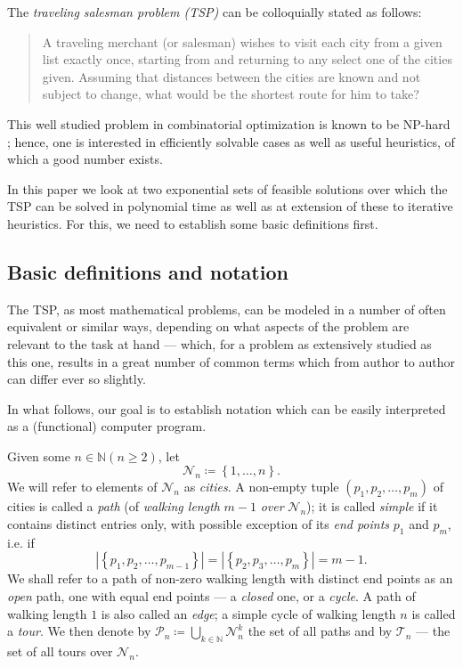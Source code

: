 \documentclass[index=totoc,bibliography=totoc]{scrartcl}
\newcommand{\annotation}[1]{\marginpar{\small\itshape\color{green}#1}}
\numberwithin{equation}{section}
\numberwithin{figure}{section}
\numberwithin{table}{section}
\let\defstyle\itshape
\begin{document}
The {\defstyle traveling salesman problem (TSP)} can be colloquially stated as follows:
\blockquote{%
  A traveling merchant (or salesman) wishes to visit each city from a given
  list exactly once, starting from and returning to any select one of the cities
  given.  Assuming that distances between the cities are known and not
  subject to change, what would be the shortest route for him to take?
}
This well studied problem in combinatorial optimization is known to be
NP-hard \cite{Karp72}; hence, one is interested in efficiently solvable
cases as well as useful heuristics, of which a good number exists.

In this paper we look at two exponential sets of feasible solutions over
which the TSP can be solved in polynomial time as well as at extension
of these to iterative heuristics.  For this, we need to establish some basic
definitions first.

\subsection{Basic definitions and notation}

The TSP, as most mathematical problems, can be modeled in a number of often
equivalent or similar ways, depending on what aspects of the problem are
relevant to the task at hand --- which, for a problem as extensively studied
as this one, results in a great number of common terms which from author to
author can differ ever so slightly.

In what follows, our goal is to establish notation which can be easily
interpreted as a (functional) computer program.

\begin{define}
Given some $n \in \mathbb{N} \left(n \geq 2\right)$,
let \[\mathcal{N}_n \coloneqq \left\{1,\ldots,n\right\}.\]
We will refer to elements of $\mathcal{N}_n$ as {\defstyle cities}.
A non-empty tuple $\left(p_1,p_2,\ldots,p_m\right)$
of cities is called a {\defstyle path} (of {\defstyle walking length} $m-1$
{\defstyle over} $\mathcal{N}_n$);
it is called {\defstyle simple} if it contains distinct entries only, with
possible exception of its {\defstyle end points} $p_1$ and $p_m$, i.e. if
\[\left|\left\{p_1,p_2,\ldots,p_{m-1}\right\}\right| =
\left|\left\{p_2,p_3,\ldots,p_{m}\right\}\right| = m-1.\]  We shall refer to
a path of non-zero walking length with distinct end points as an {\defstyle open} path,
one with equal end points --- a {\defstyle closed} one, or a {\defstyle cycle}.
A path of walking length $1$ is also called an {\defstyle edge};
a simple cycle of walking length $n$ is called a {\defstyle tour}.
We then denote by
$\mathcal{P}_n \coloneqq \bigcup_{k \in \mathbb{N}}\mathcal{N}_n^k$
the set of all paths and by
$\mathcal{T}_n$ --- the set of all tours over $\mathcal{N}_n$.
\end{define}
\end{document}
